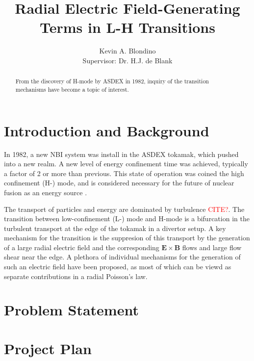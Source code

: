 \documentclass{article}
\author{Kevin A. Blondino \\
	Supervisor: Dr. H.J. de Blank}
\title{Radial Electric Field-Generating Terms in L-H Transitions}
\date{}
\newcommand\mynotes[1]{\textcolor{red}{#1}}
\begin{document}
\maketitle


\begin{abstract}
	\mynotes{\lipsum[1]}
	From the discovery of H-mode by ASDEX in 1982, inquiry of the transition mechanisms have become a topic of interest.
\end{abstract}

\section{Introduction and Background}
In 1982, a new NBI system was install in the ASDEX tokamak, which pushed into a new realm.
A new level of energy confinement time was achieved, typically a factor of 2 or more than previous.
This state of operation was coined the high confinement (H-) mode, and is considered necessary for the future of nuclear fusion as an energy source \cite{wagner_development_1984}.

The transport of particles and energy are dominated by turbulence \mynotes{CITE?}.
The transition between low-confinement (L-) mode and H-mode is a bifurcation in the turbulent transport at the edge of the tokamak in a divertor setup.
A key mechanism for the transition is the suppresion of this transport by the generation of a large radial electric field and the corresponding $\mathbf{E}\times\mathbf{B}$ flows and large flow shear near the edge.
A plethora of individual mechanisms for the generation of such an electric field have been proposed, as most of which can be viewd as separate contributions in a radial Poisson's law.


\section{Problem Statement}



\section{Project Plan}





\end{document}
